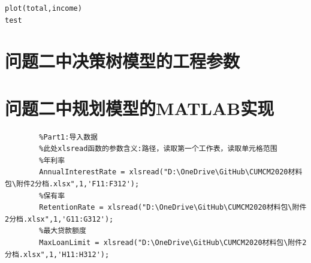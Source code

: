 \begin{appendices}
\begin{tcolorbox}[breakable]
\begin{verbatim}
plot(total,income)
test
	\end{verbatim}
	\end{tcolorbox}



	\section{问题二中决策树模型的工程参数}
	\begin{center}
		\begin{table}[H]  %
			\centering
		\end{table}
	\end{center}

	\section{问题二中规划模型的MATLAB实现}
	\begin{tcolorbox}[breakable]
		\begin{verbatim}
		%Part1:导入数据
		%此处xlsread函数的参数含义:路径，读取第一个工作表，读取单元格范围
		%年利率
		AnnualInterestRate = xlsread("D:\OneDrive\GitHub\CUMCM2020材料包\附件2分档.xlsx",1,'F11:F312');
		%保有率
		RetentionRate = xlsread("D:\OneDrive\GitHub\CUMCM2020材料包\附件2分档.xlsx",1,'G11:G312');
		%最大贷款额度
		MaxLoanLimit = xlsread("D:\OneDrive\GitHub\CUMCM2020材料包\附件2分档.xlsx",1,'H11:H312');
		

\end{verbatim}
\end{tcolorbox}
\end{appendices}
